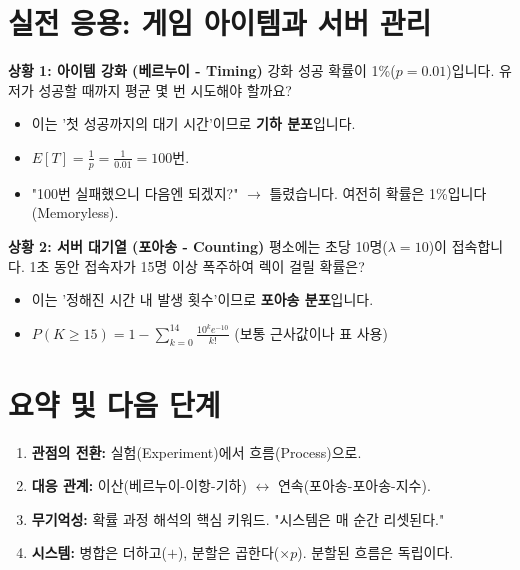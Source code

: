 \documentclass[11pt,a4paper]{book}
\theoremstyle{definition}
\begin{document}
\begin{warningbox}[title={기하 분포와 지수 분포의 관계}]
\section{실전 응용: 게임 아이템과 서버 관리}

\begin{storybox}[title={Nexon 게임 기획 및 서버 운영}]
\textbf{상황 1: 아이템 강화 (베르누이 - Timing)}
강화 성공 확률이 1\%($p=0.01$)입니다. 유저가 성공할 때까지 평균 몇 번 시도해야 할까요?
\begin{itemize}
    \item 이는 '첫 성공까지의 대기 시간'이므로 \textbf{기하 분포}입니다.
    \item $E[T] = \frac{1}{p} = \frac{1}{0.01} = 100$번.
    \item "100번 실패했으니 다음엔 되겠지?" $\to$ 틀렸습니다. 여전히 확률은 1\%입니다 (Memoryless).
\end{itemize}

\textbf{상황 2: 서버 대기열 (포아송 - Counting)}
평소에는 초당 10명($\lambda=10$)이 접속합니다. 1초 동안 접속자가 15명 이상 폭주하여 렉이 걸릴 확률은?
\begin{itemize}
    \item 이는 '정해진 시간 내 발생 횟수'이므로 \textbf{포아송 분포}입니다.
    \item $P(K \ge 15) = 1 - \sum_{k=0}^{14} \frac{10^k e^{-10}}{k!}$ (보통 근사값이나 표 사용)
\end{itemize}
\end{storybox}

\section{요약 및 다음 단계}

\begin{tcolorbox}[colback=mainblue!10, colframe=mainblue, title={\textbf{📝 Unit 3-2 핵심 요약}}]
\begin{enumerate}
    \item \textbf{관점의 전환:} 실험(Experiment)에서 흐름(Process)으로.
    \item \textbf{대응 관계:} 이산(베르누이-이항-기하) $\leftrightarrow$ 연속(포아송-포아송-지수).
    \item \textbf{무기억성:} 확률 과정 해석의 핵심 키워드. "시스템은 매 순간 리셋된다."
    \item \textbf{시스템:} 병합은 더하고($+$), 분할은 곱한다($\times p$). 분할된 흐름은 독립이다.
\end{enumerate}
\end{tcolorbox}


\end{warningbox}
\end{document}
